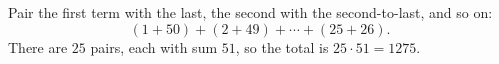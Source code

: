 Pair the first term with the last, the second with the second-to-last, and so on:
\[(1+50)+(2+49)+\cdots+(25+26).\]
There are $25$ pairs, each with sum $51$, so the total is $25\cdot51=\boxed{1275}$.
